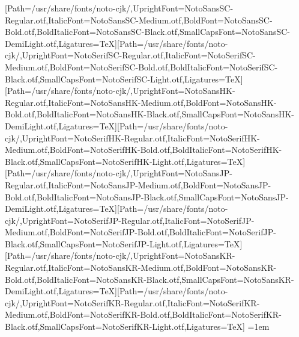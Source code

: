 \newfontfamily{}[Path=/usr/share/fonts/noto-cjk/,UprightFont=NotoSansSC-Regular.otf,ItalicFont=NotoSansSC-Medium.otf,BoldFont=NotoSansSC-Bold.otf,BoldItalicFont=NotoSansSC-Black.otf,SmallCapsFont=NotoSansSC-DemiLight.otf,Ligatures=TeX]\newfontfamily{}[Path=/usr/share/fonts/noto-cjk/,UprightFont=NotoSerifSC-Regular.otf,ItalicFont=NotoSerifSC-Medium.otf,BoldFont=NotoSerifSC-Bold.otf,BoldItalicFont=NotoSerifSC-Black.otf,SmallCapsFont=NotoSerifSC-Light.otf,Ligatures=TeX]
\newfontfamily{}[Path=/usr/share/fonts/noto-cjk/,UprightFont=NotoSansHK-Regular.otf,ItalicFont=NotoSansHK-Medium.otf,BoldFont=NotoSansHK-Bold.otf,BoldItalicFont=NotoSansHK-Black.otf,SmallCapsFont=NotoSansHK-DemiLight.otf,Ligatures=TeX]\newfontfamily{}[Path=/usr/share/fonts/noto-cjk/,UprightFont=NotoSerifHK-Regular.otf,ItalicFont=NotoSerifHK-Medium.otf,BoldFont=NotoSerifHK-Bold.otf,BoldItalicFont=NotoSerifHK-Black.otf,SmallCapsFont=NotoSerifHK-Light.otf,Ligatures=TeX]
\newfontfamily{}[Path=/usr/share/fonts/noto-cjk/,UprightFont=NotoSansJP-Regular.otf,ItalicFont=NotoSansJP-Medium.otf,BoldFont=NotoSansJP-Bold.otf,BoldItalicFont=NotoSansJP-Black.otf,SmallCapsFont=NotoSansJP-DemiLight.otf,Ligatures=TeX]\newfontfamily{}[Path=/usr/share/fonts/noto-cjk/,UprightFont=NotoSerifJP-Regular.otf,ItalicFont=NotoSerifJP-Medium.otf,BoldFont=NotoSerifJP-Bold.otf,BoldItalicFont=NotoSerifJP-Black.otf,SmallCapsFont=NotoSerifJP-Light.otf,Ligatures=TeX]
\newfontfamily{}[Path=/usr/share/fonts/noto-cjk/,UprightFont=NotoSansKR-Regular.otf,ItalicFont=NotoSansKR-Medium.otf,BoldFont=NotoSansKR-Bold.otf,BoldItalicFont=NotoSansKR-Black.otf,SmallCapsFont=NotoSansKR-DemiLight.otf,Ligatures=TeX]\newfontfamily{}[Path=/usr/share/fonts/noto-cjk/,UprightFont=NotoSerifKR-Regular.otf,ItalicFont=NotoSerifKR-Medium.otf,BoldFont=NotoSerifKR-Bold.otf,BoldItalicFont=NotoSerifKR-Black.otf,SmallCapsFont=NotoSerifKR-Light.otf,Ligatures=TeX]
\fi\fi\fi\fi\fi\fi\fi\fi
\hypersetup{colorlinks=false}
\emergencystretch=1em
\setlength{\parindent}{0pt}
\everymath{\displaystyle}
\everydisplay{\displaystyle}
\captionsetup{labelformat=empty}
\captionsetup[subfigure]{labelformat=empty}
\renewcommand{\maketitle}{
\begin{titlepage}
\begin{center}
\vspace*{\fill}
{\huge \bfseries \thetitle\par}
\vskip 1.5em
{\Large \theauthor\par}
\vskip 1em
{\large \thedate\par}
\vspace*{\fill}
\end{center}
\end{titlepage}
}
